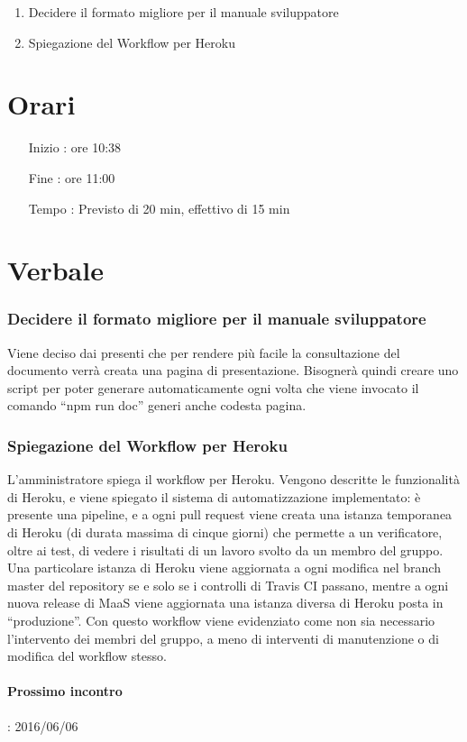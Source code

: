 \begin{enumerate}

\item Decidere il formato migliore per il manuale sviluppatore
\item Spiegazione del Workflow per Heroku
\end{enumerate}

\section{Orari}

\begin{itemize}
\item[Inizio]: ore 10:38
\item[Fine]: ore 11:00
\item[Tempo]: Previsto di 20 min, effettivo di 15 min

\end{itemize}

\section{Verbale}

\subsubsection{Decidere il formato migliore per il manuale sviluppatore}
Viene deciso dai presenti che per rendere più facile la consultazione del documento verrà creata una pagina di presentazione. Bisognerà quindi creare uno script per poter generare automaticamente ogni volta che viene invocato il comando ``npm run doc'' generi anche codesta pagina.

\subsubsection{Spiegazione del Workflow per Heroku}
L'amministratore spiega il workflow per Heroku. Vengono descritte le funzionalità di Heroku, e viene spiegato il sistema di automatizzazione implementato: è presente una pipeline, e a ogni pull request viene creata una istanza temporanea di Heroku (di durata massima di cinque giorni) che permette a un verificatore, oltre ai test, di vedere i risultati di un lavoro svolto da un membro del gruppo.
Una particolare istanza di Heroku viene aggiornata a ogni modifica nel branch master del repository se e solo se i controlli di Travis CI passano, mentre a ogni nuova release di MaaS viene aggiornata una istanza diversa di Heroku posta in ``produzione''.
Con questo workflow viene evidenziato come non sia necessario l'intervento dei membri del gruppo, a meno di interventi di manutenzione o di modifica del workflow stesso.

\paragraph*{Prossimo incontro}: 2016/06/06



